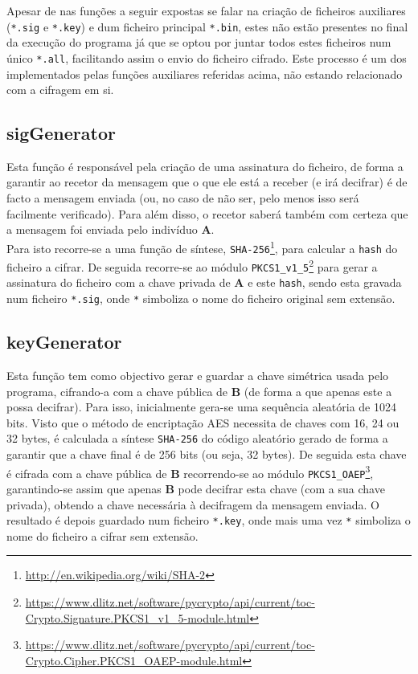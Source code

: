 \documentclass[a4paper,11pt,openright,oneside]{report}
\begin{document}
Apesar de nas funções a seguir expostas se falar na criação de ficheiros auxiliares (\verb|*.sig| e \verb|*.key|) e dum ficheiro principal \verb|*.bin|, estes não estão presentes no final da execução do programa já que se optou por juntar todos estes ficheiros num único \verb|*.all|, facilitando assim o envio do ficheiro cifrado. Este processo é um dos implementados pelas funções auxiliares referidas acima, não estando relacionado com a cifragem em si.

\subsection{sigGenerator}

Esta função é responsável pela criação de uma assinatura do ficheiro, de forma a garantir ao recetor da mensagem que o que ele está a receber (e irá decifrar) é de facto a mensagem enviada (ou, no caso de não ser, pelo menos isso será facilmente verificado). Para além disso, o recetor saberá também com certeza que a mensagem foi enviada pelo indivíduo \textbf{A}.\\

Para isto recorre-se a uma função de síntese, \verb|SHA-256|\footnote{\url{http://en.wikipedia.org/wiki/SHA-2}}, para calcular a \verb|hash| do ficheiro a cifrar. De seguida recorre-se ao módulo \verb|PKCS1_v1_5|\footnote{\url{https://www.dlitz.net/software/pycrypto/api/current/toc-Crypto.Signature.PKCS1_v1_5-module.html}} para gerar a assinatura do ficheiro com a chave privada de \textbf{A} e este \verb|hash|, sendo esta gravada num ficheiro \verb|*.sig|, onde \verb|*| simboliza o nome do ficheiro original sem extensão.

\subsection{keyGenerator}

Esta função tem como objectivo gerar e guardar a chave simétrica usada pelo programa, cifrando-a com a chave pública de \textbf{B} (de forma a que apenas este a possa decifrar). Para isso, inicialmente gera-se uma sequência aleatória de 1024 bits. Visto que o método de encriptação AES necessita de chaves com 16, 24 ou 32 bytes, é calculada a síntese \verb|SHA-256| do código aleatório gerado de forma a garantir que a chave final é de 256 bits (ou seja, 32 bytes). De seguida esta chave é cifrada com a chave pública de \textbf{B} recorrendo-se ao módulo \verb|PKCS1_OAEP|\footnote{\url{https://www.dlitz.net/software/pycrypto/api/current/toc-Crypto.Cipher.PKCS1_OAEP-module.html}}, garantindo-se assim que apenas \textbf{B} pode decifrar esta chave (com a sua chave privada), obtendo a chave necessária à decifragem da mensagem enviada. O resultado é depois guardado num ficheiro \verb|*.key|, onde mais uma vez \verb|*| simboliza o nome do ficheiro a cifrar sem extensão.\\
\end{document}

